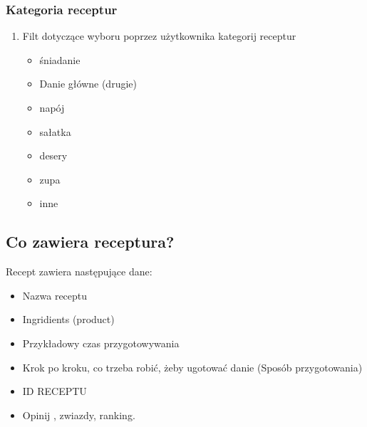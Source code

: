 \documentclass[a4paper, 12pt]{article}
\begin{document}
 		\subsubsection{Kategoria receptur}
 		\begin{enumerate}
 		    \item Filt dotyczące wyboru poprzez użytkownika kategorij receptur
 		    \begin{itemize}
 		        \item śniadanie
 		        \item Danie główne (drugie)
 		        \item napój
 		        \item sałatka
 		        \item desery
 		        \item zupa
 		        \item inne
 		    \end{itemize}
 		\end{enumerate}
 		\subsection{Co zawiera receptura?}
 		Recept zawiera następujące dane: 
 		\begin{itemize}
 		    \item Nazwa receptu
 		    \item Ingridients (product) 
 		    \item Przykładowy czas przygotowywania
 		    \item Krok po kroku, co trzeba robić, żeby ugotować danie (Sposób przygotowania)
 		    \item ID RECEPTU
 		    \item Opinij , zwiazdy, ranking. 
 		\end{itemize}
\end{document}
